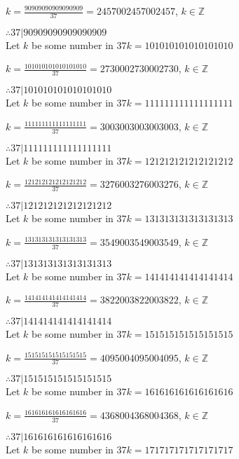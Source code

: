 \documentclass{article}
\begin{document}
$k = \frac{90909090909090909}{37} = 2457002457002457$, $k \in \mathbb{Z}$

$ \therefore  37|90909090909090909 $ \\

Let $k$ be some number in $37k = 101010101010101010$

$k = \frac{101010101010101010}{37} = 2730002730002730$, $k \in \mathbb{Z}$

$ \therefore  37|101010101010101010 $ \\

Let $k$ be some number in $37k = 111111111111111111$

$k = \frac{111111111111111111}{37} = 3003003003003003$, $k \in \mathbb{Z}$

$ \therefore  37|111111111111111111 $ \\

Let $k$ be some number in $37k = 121212121212121212$

$k = \frac{121212121212121212}{37} = 3276003276003276$, $k \in \mathbb{Z}$

$ \therefore  37|121212121212121212 $ \\

Let $k$ be some number in $37k = 131313131313131313$

$k = \frac{131313131313131313}{37} = 3549003549003549$, $k \in \mathbb{Z}$

$ \therefore  37|131313131313131313 $ \\

Let $k$ be some number in $37k = 141414141414141414$

$k = \frac{141414141414141414}{37} = 3822003822003822$, $k \in \mathbb{Z}$

$ \therefore  37|141414141414141414 $ \\

Let $k$ be some number in $37k = 151515151515151515$

$k = \frac{151515151515151515}{37} = 4095004095004095$, $k \in \mathbb{Z}$

$ \therefore  37|151515151515151515 $ \\

Let $k$ be some number in $37k = 161616161616161616$

$k = \frac{161616161616161616}{37} = 4368004368004368$, $k \in \mathbb{Z}$

$ \therefore  37|161616161616161616 $ \\

Let $k$ be some number in $37k = 171717171717171717$
\end{document}
